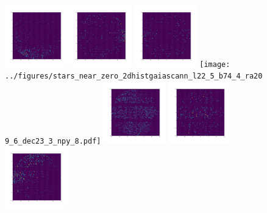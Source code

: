 \documentclass[12pt,prd]{article}
\begin{document}
\begin{figure}[h!]
\includegraphics[width=0.24\textwidth]{../figures/stars_near_zero_2dhistgaiascan_l22_5_b74_4_ra209_6_dec23_3_npy_5.pdf}
\includegraphics[width=0.24\textwidth]{../figures/stars_near_zero_2dhistgaiascan_l22_5_b74_4_ra209_6_dec23_3_npy_6.pdf}
\includegraphics[width=0.24\textwidth]{../figures/stars_near_zero_2dhistgaiascan_l22_5_b74_4_ra209_6_dec23_3_npy_7.pdf}
\texttt{[image: ../figures/stars\_near\_zero\_2dhistgaiascann\_l22\_5\_b74\_4\_ra209\_6\_dec23\_3\_npy\_8.pdf]}
\includegraphics[width=0.24\textwidth]{../figures/stars_near_zero_2dhistgaiascan_l22_5_b74_4_ra209_6_dec23_3_npy_9.pdf}
\includegraphics[width=0.24\textwidth]{../figures/stars_near_zero_2dhistgaiascan_l22_5_b74_4_ra209_6_dec23_3_npy_10.pdf}
\includegraphics[width=0.24\textwidth]{../figures/stars_near_zero_2dhistgaiascan_l22_5_b74_4_ra209_6_dec23_3_npy_11.pdf}

\end{figure}
\end{document}
